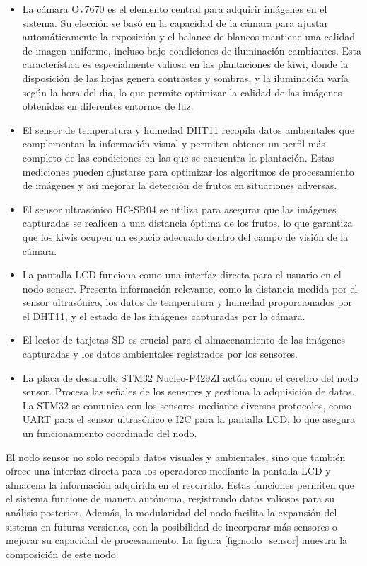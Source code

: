 \begin{itemize}
\item La cámara Ov7670 es el elemento central para adquirir imágenes en el sistema. Su elección se basó en la capacidad de la cámara para ajustar automáticamente la exposición y el balance de blancos mantiene una calidad de imagen uniforme, incluso bajo condiciones de iluminación cambiantes. Esta característica es especialmente valiosa en las plantaciones de kiwi, donde la disposición de las hojas genera contrastes y sombras, y la iluminación varía según la hora del día, lo que permite optimizar la calidad de las imágenes obtenidas en diferentes entornos de luz.

\item El sensor de temperatura y humedad DHT11 recopila datos ambientales que complementan la información visual y  permiten obtener un perfil más completo de las condiciones en las que se encuentra la plantación. Estas mediciones pueden ajustarse para optimizar los algoritmos de procesamiento de imágenes y así mejorar la detección de frutos en situaciones adversas.
\item El sensor ultrasónico HC-SR04 se utiliza para asegurar que las imágenes capturadas se realicen a una distancia óptima de los frutos, lo que garantiza que los kiwis ocupen un espacio adecuado dentro del campo de visión de la cámara.
\item La pantalla LCD funciona como una interfaz directa para el usuario en el nodo sensor. Presenta información relevante, como la distancia medida por el sensor ultrasónico, los datos de temperatura y humedad proporcionados por el DHT11, y el estado de las imágenes capturadas por la cámara.
\item El lector de tarjetas SD es crucial para el almacenamiento de las imágenes capturadas y los datos ambientales registrados por los sensores.
\item La placa de desarrollo STM32 Nucleo-F429ZI actúa como el cerebro del nodo sensor. Procesa las señales de los sensores y gestiona la adquisición de datos. La STM32 se comunica con los sensores mediante diversos protocolos, como UART para el sensor ultrasónico e I2C para la pantalla LCD, lo que asegura un funcionamiento coordinado del nodo.
\end{itemize}

El nodo sensor no solo recopila datos visuales y ambientales, sino que también ofrece una interfaz directa para los operadores mediante la pantalla LCD y almacena la información adquirida en el recorrido. Estas funciones permiten que el sistema funcione de manera autónoma, registrando datos valiosos para su análisis posterior. Además, la modularidad del nodo facilita la expansión del sistema en futuras versiones, con la posibilidad de incorporar más sensores o mejorar su capacidad de procesamiento. La figura \ref{fig:nodo_sensor} muestra la composición de este nodo.

